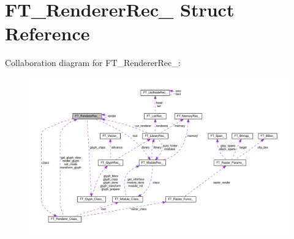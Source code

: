 \hypertarget{structFT__RendererRec__}{}\section{F\+T\+\_\+\+Renderer\+Rec\+\_\+ Struct Reference}
\label{structFT__RendererRec__}


Collaboration diagram for F\+T\+\_\+\+Renderer\+Rec\+\_\+\+:
\nopagebreak
\begin{figure}[H]
\begin{center}
\leavevmode
\includegraphics[width=350pt]{structFT__RendererRec____coll__graph}
\end{center}
\end{figure}
